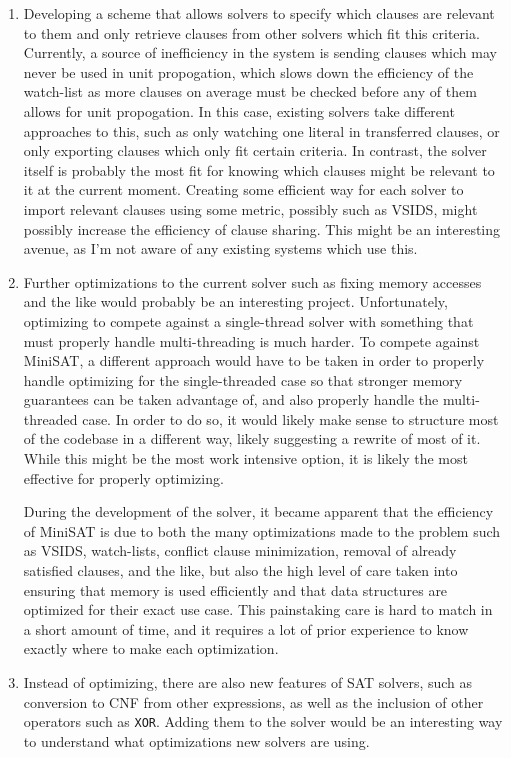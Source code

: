 \documentclass[11pt]{extarticle}
\begin{document}
\begin{enumerate}
\item
Developing a scheme that allows solvers to specify which clauses are relevant to them and only
retrieve clauses from other solvers which fit this criteria. Currently, a source of inefficiency
in the system is sending clauses which may never be used in unit propogation, which slows down
the efficiency of the watch-list as more clauses on average must be checked before any of them
allows for unit propogation. In this case, existing solvers take different approaches to this,
such as only watching one literal in transferred clauses, or only exporting clauses which only
fit certain criteria. In contrast, the solver itself is probably the most fit for knowing which
clauses might be relevant to it at the current moment. Creating some efficient way for each
solver to import relevant clauses using some metric, possibly such as VSIDS, might possibly
increase the efficiency of clause sharing. This might be an interesting avenue, as I'm not aware
of any existing systems which use this.
\item
Further optimizations to the current solver such as fixing memory accesses and the like would
probably be an interesting project. Unfortunately, optimizing to compete against a single-thread
solver with something that must properly handle multi-threading is much harder. To compete
against MiniSAT, a different approach would have to be taken in order to properly handle
optimizing for the single-threaded case so that stronger memory guarantees can be taken
advantage of, and also properly handle the multi-threaded case. In order to do so, it would
likely make sense to structure most of the codebase in a different way, likely suggesting a
rewrite of most of it. While this might be the most work intensive option, it is likely the most
effective for properly optimizing.

During the development of the solver, it became apparent that the efficiency of MiniSAT is due
to both the many optimizations made to the problem such as VSIDS, watch-lists, conflict clause
minimization, removal of already satisfied clauses, and the like, but also the high level of
care taken into ensuring that memory is used efficiently and that data structures are optimized
for their exact use case. This painstaking care is hard to match in a short amount of time, and
it requires a lot of prior experience to know exactly where to make each optimization.
\item
Instead of optimizing, there are also new features of SAT solvers, such as conversion to CNF
from other expressions, as well as the inclusion of other operators such as \texttt{XOR}. Adding
them to the solver would be an interesting way to understand what optimizations new solvers are
using.
\end{enumerate}
\end{document}
